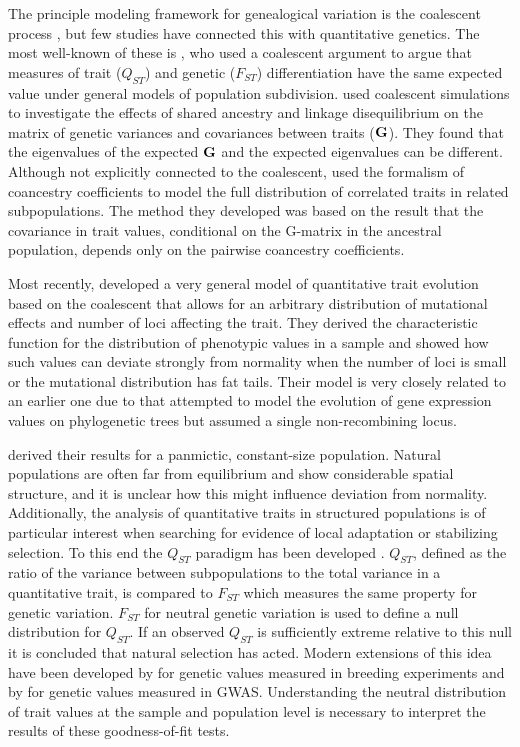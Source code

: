 The principle modeling framework for genealogical variation is the coalescent
process \citep{Wakeley2008}, but few studies have connected this with
quantitative genetics. The most well-known of these is
\citet{Whitlock1999}, who used a coalescent argument to argue that measures of trait ($Q_{ST}$) and
genetic ($F_{ST}$) differentiation have the same expected value under general
models of population subdivision. \citet{Griswold2007} used coalescent
simulations to investigate the effects of shared ancestry and linkage
disequilibrium on the matrix of genetic variances and covariances between traits
($\mbox{\textbf{G}}$). They found that the eigenvalues of the expected
$\mbox{\textbf{G}}$ and the expected eigenvalues can be different. Although not
explicitly connected to the coalescent,
\citet{Ovaskainen2011} used the formalism of coancestry coefficients to model
the full distribution of correlated traits in related subpopulations. The method
they developed was based on the result that the covariance in trait values,
conditional on the G-matrix in the ancestral population, depends only on the
pairwise coancestry coefficients.

Most recently, \citet{Schraiber2015} developed a very general model of
quantitative trait evolution based on the coalescent that allows for an
arbitrary distribution of mutational effects and number of loci affecting the
trait. They derived the characteristic function for the distribution of
phenotypic values in a sample and showed how such values can deviate strongly
from normality when the number of loci is small or the mutational distribution
has fat tails. Their model is very closely related to an earlier one due
to \citet{Khaitovich2005} that attempted to model the evolution of gene
expression values on phylogenetic trees but assumed a single non-recombining
locus.

\citet{Schraiber2015} derived their results for a panmictic, constant-size
population. Natural populations are often far from equilibrium and show
considerable spatial structure, and it is unclear how this might influence
deviation from normality. Additionally, the analysis of quantitative traits in
structured populations is of particular interest when searching for evidence of
local adaptation or stabilizing selection. To this end the $Q_{ST}$ paradigm has
been developed \citep{Whitlock2008,Spitze1993}. $Q_{ST}$, defined as the ratio
of the variance between subpopulations to the total variance in a quantitative
trait, is compared to $F_{ST}$ which measures the same property for genetic
variation. $F_{ST}$ for neutral genetic variation is used to define a null
distribution for $Q_{ST}$. If an observed $Q_{ST}$ is sufficiently extreme
relative to this null it is concluded that natural selection has acted. Modern
extensions of this idea have been developed by \citet{Ovaskainen2011} for
genetic values measured in breeding experiments and by \citet{Berg2014} for
genetic values measured in GWAS. Understanding the neutral distribution of trait
values at the sample and population level is necessary to interpret the results
of these goodness-of-fit tests.


